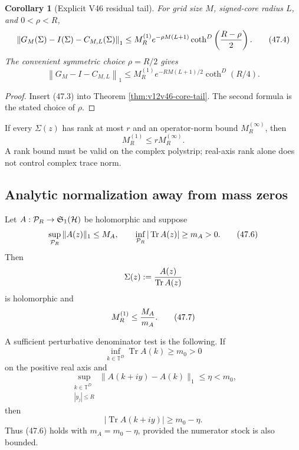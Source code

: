 \documentclass[11pt]{article}
\newtheorem{corollary}[theorem]{Corollary}
\theoremstyle{remark}
\begin{document}
\begin{corollary}[Explicit V46 residual tail]
\label{cor:v12v47-tail}
For grid size \(M\), signed-core radius \(L\), and
\(0<\rho<R\),
\begin{equation}
 \left\|
 G_M(\Sigma)-I(\Sigma)-C_{M,L}(\Sigma)
 \right\|_1
 \leq
 M_R^{(1)}
 e^{-\rho M(L+1)}
 \coth^D\left({R-\rho\over2}\right).              \tag{47.4}
\end{equation}
The convenient symmetric choice \(\rho=R/2\) gives
\begin{equation}
 \left\|
 G_M-I-C_{M,L}
 \right\|_1
 \leq
 M_R^{(1)}
 e^{-RM(L+1)/2}
 \coth^D(R/4).                                   \tag{47.5}
\end{equation}
\end{corollary}

\begin{proof}
Insert (47.3) into Theorem
\ref{thm:v12v46-core-tail}.  The second formula is the stated choice
of \(\rho\).
\end{proof}

If every \(\Sigma(z)\) has rank at most \(r\) and an operator-norm
bound \(M_R^{(\infty)}\), then
\[
 M_R^{(1)}\leq rM_R^{(\infty)}.
\]
A rank bound must be valid on the complex polystrip; real-axis rank
alone does not control complex trace norm.

\subsection{Analytic normalization away from mass zeros}

Let \(A:{\cal P}_R\to{\mathfrak S}_1({\cal H})\) be holomorphic and
suppose
\begin{equation}
 \sup_{{\cal P}_R}\|A(z)\|_1\leq M_A,\qquad
 \inf_{{\cal P}_R}|\operatorname{Tr}A(z)|\geq m_A>0.
                                                        \tag{47.6}
\end{equation}
Then
\[
 \Sigma(z):={A(z)\over\operatorname{Tr}A(z)}
\]
is holomorphic and
\begin{equation}
                         M_R^{(1)}\leq {M_A\over m_A}.      \tag{47.7}
\end{equation}

A sufficient perturbative denominator test is the following.  If
\[
 \inf_{k\in{\mathbb T}^D}\operatorname{Tr}A(k)\geq m_0>0
\]
on the positive real axis and
\begin{equation}
 \sup_{\substack{k\in{\mathbb T}^D\\|y_j|\leq R}}
 \|A(k+iy)-A(k)\|_1\leq\eta<m_0,                 \tag{47.8}
\end{equation}
then
\[
 |\operatorname{Tr}A(k+iy)|
 \geq m_0-\eta.
\]
Thus (47.6) holds with \(m_A=m_0-\eta\), provided the numerator
stock is also bounded.
\end{document}
